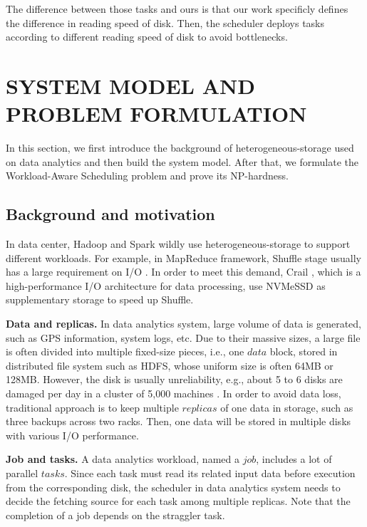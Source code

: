 \documentclass[conference]{IEEEtran}
\begin{document}
The difference between those tasks and ours is that our work specificly defines the difference in reading speed of disk. Then, the scheduler deploys tasks according to different reading speed of disk to avoid bottlenecks.

\section{SYSTEM MODEL AND PROBLEM FORMULATION}\label{SYSTEM_MODEL}
In this section, we first introduce the background of heterogeneous-storage used on data analytics and then build the system model. After that, we formulate the Workload-Aware Scheduling problem and prove its NP-hardness. 

\subsection{Background and motivation}\label{AA}

In data center, Hadoop and Spark wildly use heterogeneous-storage to support different workloads. For example, in MapReduce framework, Shuffle \cite{b42} \cite{b41} stage usually has a large requirement on I/O . In order to meet this demand, Crail \cite{b37}, which is a high-performance I/O architecture for data processing, use NVMeSSD as supplementary storage to speed up Shuffle.

\textbf{Data and replicas.} In data analytics system, large volume of data is generated, such as GPS information\cite{b38}, system logs\cite{b39}, etc. Due to their massive sizes, a large file is often divided into multiple fixed-size pieces, i.e., one $data$ block, stored in distributed file system such as HDFS\cite{b19}, whose uniform size is often 64MB or 128MB. However, the disk is usually unreliability, e.g., about 5 to 6 disks are damaged per day in a cluster of 5,000 machines \cite{b32}. In order to avoid data loss, traditional approach is to keep multiple $replicas$ of one data in storage, such as three backups across two racks. Then, one data will be stored in multiple disks with various I/O performance.

\textbf{Job and tasks.} A data analytics workload, named a $job$, includes a lot of parallel $tasks$. Since each task must read its related input data before execution from the corresponding disk, the scheduler in data analytics system needs to decide the fetching source for each task among multiple replicas. Note that the completion of a job depends on the straggler task.
\end{document}

